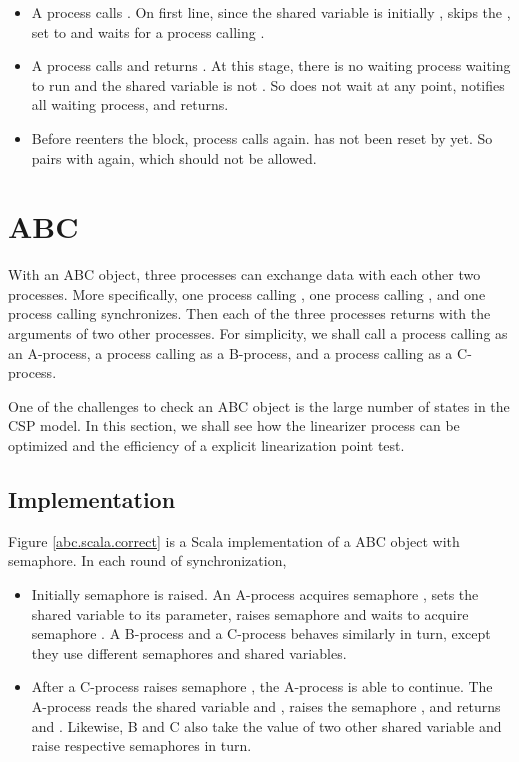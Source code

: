 \documentclass{article}
\begin{document}

\begin{itemize}
  \item A process  calls . On first line, since the shared variable  is initially ,  skips the , set  to  and waits for a process calling .
  \item A process  calls  and returns . At this stage, there is no waiting process waiting to run  and the shared variable is not . So  does not wait at any point, notifies all waiting process, and returns.
  \item Before  reenters the  block, process  calls  again.  has not been reset by  yet. So  pairs with  again, which should not be allowed. 
\end{itemize}
\section{ABC}
With an ABC object, three processes can exchange data with each other two processes. More specifically, one process calling , one process calling , and one process calling  synchronizes. Then each of the three processes returns with the arguments of two other processes. For simplicity, we shall call a process calling  as an A-process, a process calling  as a B-process, and a process calling  as a C-process. 

One of the challenges to check an ABC object is the large number of states in the CSP model. In this section, we shall see how the linearizer process can be optimized and the efficiency of a explicit linearization point test.

\subsection{Implementation}
Figure \ref{abc.scala.correct} is a Scala implementation of a ABC object with semaphore. In each round of synchronization,
\begin{itemize}
    \item Initially semaphore  is raised. An A-process acquires semaphore , sets the shared variable  to its parameter, raises semaphore  and waits to acquire semaphore . A B-process and a C-process behaves similarly in turn, except they use different semaphores and shared variables. 
    \item After a C-process raises semaphore , the A-process is able to continue. The A-process reads the shared variable  and , raises the semaphore , and returns  and . Likewise, B and C also take the value of two other shared variable and raise respective semaphores in turn.
\end{itemize}
\end{document}
